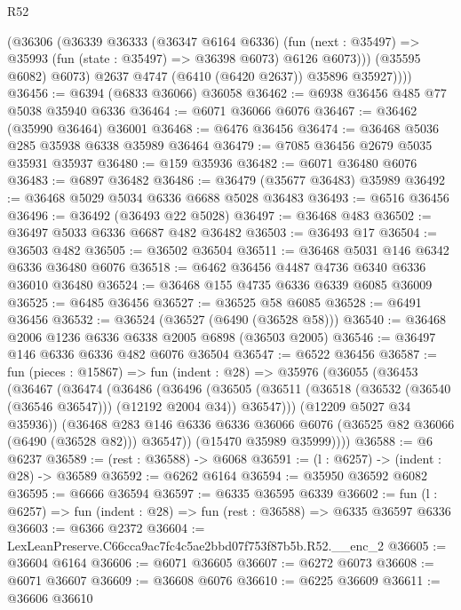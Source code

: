 \begin{lexlean}{R52}
\begin{coremodule}
              (@36306
                (@36339
                  @36333
                  (@36347 @6164 @6336)
                  (fun (next : @35497) =>
                  @35993 (fun (state : @35497) => @36398 @6073) @6126 @6073)))
              (@35595 @6082)
              @6073)
            @2637
            @4747
            (@6410 (@6420 @2637))
            @35896
            @35927))))
@36456 := @6394 (@6833 @36066) @36058
@36462 := @6938 @36456 @485 @77 @5038 @35940 @6336
@36464 := @6071 @36066 @6076
@36467 := @36462 (@35990 @36464) @36001
@36468 := @6476 @36456
@36474 := @36468 @5036 @285 @35938 @6338 @35989 @36464
@36479 := @7085 @36456 @2679 @5035 @35931 @35937
@36480 := @159 @35936
@36482 := @6071 @36480 @6076
@36483 := @6897 @36482
@36486 := @36479 (@35677 @36483) @35989
@36492 := @36468 @5029 @5034 @6336 @6688 @5028 @36483
@36493 := @6516 @36456
@36496 := @36492 (@36493 @22 @5028)
@36497 := @36468 @483
@36502 := @36497 @5033 @6336 @6687 @482 @36482
@36503 := @36493 @17
@36504 := @36503 @482
@36505 := @36502 @36504
@36511 := @36468 @5031 @146 @6342 @6336 @36480 @6076
@36518 := @6462 @36456 @4487 @4736 @6340 @6336 @36010 @36480
@36524 := @36468 @155 @4735 @6336 @6339 @6085 @36009
@36525 := @6485 @36456
@36527 := @36525 @58 @6085
@36528 := @6491 @36456
@36532 := @36524 (@36527 (@6490 (@36528 @58)))
@36540 := @36468 @2006 @1236 @6336 @6338 @2005 @6898 (@36503 @2005)
@36546 := @36497 @146 @6336 @6336 @482 @6076 @36504
@36547 := @6522 @36456
@36587 := fun (pieces : @15867) =>
  fun (indent : @28) =>
  @35976
    (@36055
      (@36453
        (@36467
          (@36474
            (@36486
              (@36496
                (@36505
                  (@36511 (@36518 (@36532 (@36540 (@36546 @36547))) (@12192 @2004 @34)) @36547)))
              (@12209 @5027 @34 @35936))
            (@36468
              @283
              @146
              @6336
              @6336
              @36066
              @6076
              (@36525 @82 @36066 (@6490 (@36528 @82)))
              @36547))
          (@15470 @35989 @35999))))
@36588 := @6 @6237
@36589 := (rest : @36588) -> @6068
@36591 := (l : @6257) -> (indent : @28) -> @36589
@36592 := @6262 @6164
@36594 := @35950 @36592 @6082
@36595 := @6666 @36594
@36597 := @6335 @36595 @6339
@36602 := fun (l : @6257) => fun (indent : @28) => fun (rest : @36588) => @6335 @36597 @6336
@36603 := @6366 @2372
@36604 := LexLeanPreserve.C66cca9ac7fc4c5ae2bbd07f753f87b5b.R52.__enc_2
@36605 := @36604 @6164
@36606 := @6071 @36605
@36607 := @6272 @6073
@36608 := @6071 @36607
@36609 := @36608 @6076
@36610 := @6225 @36609
@36611 := @36606 @36610

\end{coremodule}
\end{lexlean}
